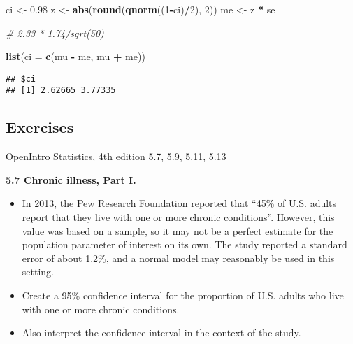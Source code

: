 \documentclass[]{book}
\newenvironment{Shaded}{\begin{snugshade}}{\end{snugshade}}
\newcommand{\CommentTok}[1]{\textcolor[rgb]{0.56,0.35,0.01}{\textit{#1}}}
\newcommand{\DataTypeTok}[1]{\textcolor[rgb]{0.13,0.29,0.53}{#1}}
\newcommand{\DecValTok}[1]{\textcolor[rgb]{0.00,0.00,0.81}{#1}}
\newcommand{\FloatTok}[1]{\textcolor[rgb]{0.00,0.00,0.81}{#1}}
\newcommand{\KeywordTok}[1]{\textcolor[rgb]{0.13,0.29,0.53}{\textbf{#1}}}
\newcommand{\NormalTok}[1]{#1}
\newcommand{\OperatorTok}[1]{\textcolor[rgb]{0.81,0.36,0.00}{\textbf{#1}}}
\newcommand{\StringTok}[1]{\textcolor[rgb]{0.31,0.60,0.02}{#1}}
\providecommand{\tightlist}{%
  \setlength{\itemsep}{0pt}\setlength{\parskip}{0pt}}
\begin{document}
\begin{Shaded}
\begin{Highlighting}[]
\NormalTok{ci <-}\StringTok{ }\FloatTok{0.98}
\NormalTok{z <-}\StringTok{ }\KeywordTok{abs}\NormalTok{(}\KeywordTok{round}\NormalTok{(}\KeywordTok{qnorm}\NormalTok{((}\DecValTok{1}\OperatorTok{-}\NormalTok{ci)}\OperatorTok{/}\DecValTok{2}\NormalTok{), }\DecValTok{2}\NormalTok{))}
\NormalTok{me <-}\StringTok{ }\NormalTok{z }\OperatorTok{*}\StringTok{ }\NormalTok{se}

\CommentTok{# 2.33 * 1.74/sqrt(50)}

\KeywordTok{list}\NormalTok{(}\DataTypeTok{ci =} \KeywordTok{c}\NormalTok{(mu }\OperatorTok{-}\StringTok{ }\NormalTok{me, mu }\OperatorTok{+}\StringTok{ }\NormalTok{me))}
\end{Highlighting}
\end{Shaded}

\begin{verbatim}
## $ci
## [1] 2.62665 3.77335
\end{verbatim}

\hypertarget{exercises-1}{%
\subsection*{Exercises}\label{exercises-1}}

OpenIntro Statistics, 4th edition
5.7, 5.9, 5.11, 5.13

\textbf{5.7 Chronic illness, Part I.}

\begin{itemize}
\tightlist
\item
  In 2013, the Pew Research Foundation reported that ``45\% of U.S. adults report
  that they live with one or more chronic conditions''. However, this value was based on a sample, so it may not be a perfect estimate for the population parameter of interest on its own. The study reported a standard error of about 1.2\%, and a normal model may reasonably be used in this setting.
\item
  Create a 95\% confidence interval for the proportion of U.S. adults who live with one or more chronic conditions.
\item
  Also interpret the confidence interval in the context of the study.
\end{itemize}

\begin{Shaded}
\end{Shaded}
\end{document}
